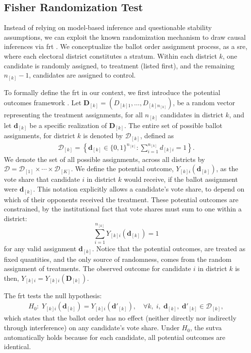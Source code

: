 \documentclass[10pt]{article}
\theoremstyle{sfstyle}
\theoremstyle{remark}
\newcommand{\bc}[1]{{\left\lbrace #1 \right\rbrace}}
\begin{document}
\subsection{Fisher Randomization Test}

Instead of relying on model-based inference
and questionable stability assumptions,
we can exploit the known randomization mechanism
to draw causal inferences via \gls{frt} \citep{fisher1935design}.
We conceptualize the ballot order assignment process,
as a \gls{sre},
where each electoral district constitutes a stratum.
Within each district $k$,
one candidate is randomly assigned,
to treatment (listed first),
and the remaining $n_{[k]}-1$,
candidates are assigned to control.

To formally define the \gls{frt} in our context,
we first introduce the potential outcomes framework 
\citep{neyman1923application, rubin1974estimating, rosenbaum2007interference, imbens2015causal}.
Let $\mathbf{D}_{[k]} = (D_{[k]1}, \ldots, D_{[k]n_{[k]}})$,
be a random vector representing the treatment assignments,
for all $n_{[k]}$ candidates in district $k$,
and let $\mathbf{d}_{[k]}$ be a specific realization of $\mathbf{D}_{[k]}$.
The entire set of possible ballot assignments,
for district $k$ is denoted by $\mathcal{D}_{[k]}$,
defined as
\begin{align}
  \mathcal{D}_{[k]} = \bc{\mathbf{d}_{[k]} \in \{0,1\}^{n_{[k]}} : \sum_{i=1}^{n_{[k]}} d_{[k]i} = 1}.
\end{align}
We denote the set of all possible assignments,
across all districts by $\mathcal{D} = \mathcal{D}_{[1]} \times \cdots \times \mathcal{D}_{[K]}$.
We define the potential outcome, $Y_{[k]i}(\mathbf{d}_{[k]})$,
as the vote share that candidate $i$ in district $k$ would receive,
if the ballot assignment were $\mathbf{d}_{[k]}$.
This notation explicitly allows a candidate's vote share,
to depend on which of their opponents received the treatment.
These potential outcomes are constrained,
by the institutional fact that vote shares must sum to one within a district:
\[
\sum_{i=1}^{n_{[k]}} Y_{[k]i}(\mathbf{d}_{[k]}) = 1
\]
for any valid assignment $\mathbf{d}_{[k]}$.
Notice that the potential outcomes,
are treated as fixed quantities,
and the only source of randomness,
comes from the random assignment of treatments.
The observed outcome for candidate $i$ in district $k$ is then,
$Y_{[k]i} = Y_{[k]i}(\mathbf{D}_{[k]})$.

The \gls{frt} tests the null hypothesis:
\begin{align}
  H_0:
  \;
  Y_{[k]i}(\mathbf{d}_{[k]}) = Y_{[k]i}(\mathbf{d}'_{[k]}),
  \quad \forall k,\; i,\; \mathbf{d}_{[k]},\; \mathbf{d}'_{[k]} \in \mathcal{D}_{[k]},
  \label{eq:null-hypothesis}
\end{align}
which states that
the ballot order has no effect
(neither directly nor indirectly through interference)
on any candidate's vote share.
Under $H_0$,
the \gls{sutva} automatically holds
because for each candidate,
all potential outcomes are identical.
\end{document}
